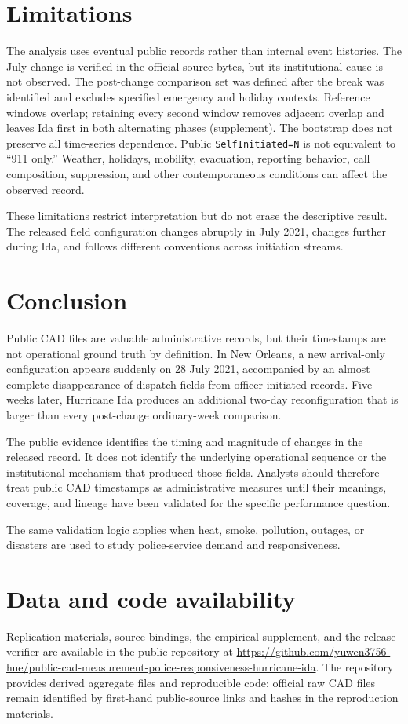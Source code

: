\documentclass[11pt]{article}
\begin{document}
\section{Limitations}

The analysis uses eventual public records rather than internal event histories. The July change is verified in the official source bytes, but its institutional cause is not observed. The post-change comparison set was defined after the break was identified and excludes specified emergency and holiday contexts. Reference windows overlap; retaining every second window removes adjacent overlap and leaves Ida first in both alternating phases (supplement). The bootstrap does not preserve all time-series dependence. Public \texttt{SelfInitiated=N} is not equivalent to ``911 only.'' Weather, holidays, mobility, evacuation, reporting behavior, call composition, suppression, and other contemporaneous conditions can affect the observed record.

These limitations restrict interpretation but do not erase the descriptive result. The released field configuration changes abruptly in July 2021, changes further during Ida, and follows different conventions across initiation streams.

\section{Conclusion}

Public CAD files are valuable administrative records, but their timestamps are not operational ground truth by definition. In New Orleans, a new arrival-only configuration appears suddenly on 28 July 2021, accompanied by an almost complete disappearance of dispatch fields from officer-initiated records. Five weeks later, Hurricane Ida produces an additional two-day reconfiguration that is larger than every post-change ordinary-week comparison.

The public evidence identifies the timing and magnitude of changes in the released record. It does not identify the underlying operational sequence or the institutional mechanism that produced those fields. Analysts should therefore treat public CAD timestamps as administrative measures until their meanings, coverage, and lineage have been validated for the specific performance question.

The same validation logic applies when heat, smoke, pollution, outages, or disasters are used to study police-service demand and responsiveness.

\section*{Data and code availability}

Replication materials, source bindings, the empirical supplement, and the release verifier are available in the public repository at \url{https://github.com/yuwen3756-hue/public-cad-measurement-police-responsiveness-hurricane-ida}. The repository provides derived aggregate files and reproducible code; official raw CAD files remain identified by first-hand public-source links and hashes in the reproduction materials.



\end{document}
